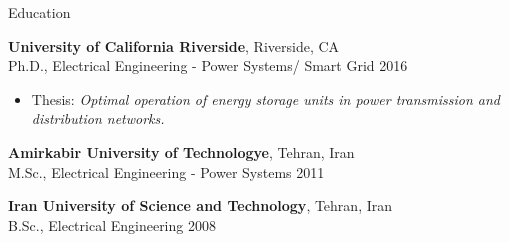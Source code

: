 \documentclass{resume} %
\begin{document}

\begin{rSection}{Education}


\textbf{University of California Riverside}, Riverside, CA \\
 Ph.D.,   Electrical Engineering - Power Systems/ Smart Grid                   \hfill       2016
\begin{itemize}
        \item [] Thesis: \emph{Optimal operation of energy storage units in power transmission and distribution networks.}
\end{itemize}
  

\textbf{Amirkabir University of Technologye}, Tehran, Iran \\
%
 M.Sc., Electrical Engineering - Power Systems  \hfill 2011 


\textbf{Iran University of Science and Technology}, Tehran, Iran \\
 B.Sc., Electrical Engineering \hfill 2008




\end{rSection}

\end{document}
